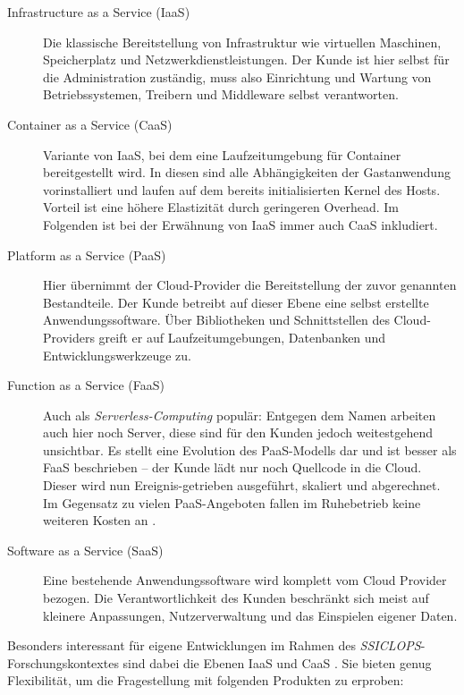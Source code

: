 \begin{description}
	
	\item[Infrastructure as a Service (IaaS)] Die klassische Bereitstellung von Infrastruktur wie virtuellen Maschinen, Speicherplatz und Netzwerkdienstleistungen. Der Kunde ist hier selbst für die Administration zuständig, muss also Einrichtung und Wartung von Betriebssystemen, Treibern und Middleware selbst verantworten.
	
	\item[Container as a Service (CaaS)] Variante von IaaS, bei dem eine Laufzeitumgebung für Container bereitgestellt wird. In diesen sind alle Abhängigkeiten der Gastanwendung vorinstalliert und laufen auf dem bereits initialisierten Kernel des Hosts. Vorteil ist eine höhere Elastizität durch geringeren Overhead. Im Folgenden ist bei der Erwähnung von IaaS immer auch CaaS inkludiert.
	
	\item[Platform as a Service (PaaS)] Hier übernimmt der Cloud-Provider die Bereitstellung der zuvor genannten Bestandteile. Der Kunde betreibt auf dieser Ebene eine selbst erstellte Anwendungssoftware. Über Bibliotheken und Schnittstellen des Cloud-Providers greift er auf Laufzeitumgebungen, Datenbanken und Entwicklungswerkzeuge zu.
	
	\item[Function as a Service (FaaS)] Auch als \emph{Serverless-Computing} populär: Entgegen dem Namen arbeiten auch hier noch Server, diese sind für den Kunden jedoch weitestgehend unsichtbar. Es stellt eine Evolution des PaaS-Modells dar und ist besser als FaaS beschrieben -- der Kunde lädt nur noch Quellcode in die Cloud. Dieser wird nun Ereignis-getrieben ausgeführt, skaliert und abgerechnet. Im Gegensatz zu vielen PaaS-Angeboten fallen im Ruhebetrieb keine weiteren Kosten an \cite{crisp:2016:serverless-infrastructure}.
	
	\item[Software as a Service (SaaS)] Eine bestehende Anwendungssoftware wird komplett vom Cloud Provider bezogen. Die Verantwortlichkeit des Kunden beschränkt sich meist auf kleinere Anpassungen, Nutzerverwaltung und das Einspielen eigener Daten.
	
\end{description}

Besonders interessant für eigene Entwicklungen im Rahmen des \emph{SSICLOPS}-For\-sch\-ungs\-kon\-tex\-tes sind dabei die Ebenen IaaS und CaaS \cite{ssiclops:2015:d6.1-project-presentation}. Sie bieten genug Flexibilität, um die Fragestellung mit folgenden Produkten zu erproben:

